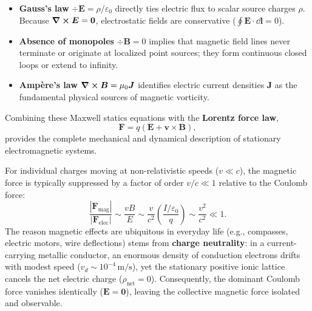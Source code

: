 \begin{remark}
    \begin{itemize}
        \item \textbf{Gauss's law} $\div \bm{E} = \rho / \varepsilon_0$ directly ties electric flux to scalar source charges $\rho$. Because $\curl \bm{E} = \bm{0}$, electrostatic fields are conservative ($\oint \bm{E}\cdot \dd{\bm{l}} = 0$).
        \item \textbf{Absence of monopoles} $\div \bm{B} = 0$ implies that magnetic field lines never terminate or originate at localized point sources; they form continuous closed loops or extend to infinity.
        \item \textbf{Ampère's law} $\curl \bm{B} = \mu_0 \bm{J}$ identifies electric current densities $\bm{J}$ as the fundamental physical sources of magnetic vorticity.
    \end{itemize}
\end{remark}

Combining these Maxwell statics equations with the \textbf{Lorentz force law},
\begin{equation}
    \bm{F} = q(\bm{E} + \bm{v}\times \bm{B}),
\end{equation}
provides the complete mechanical and dynamical description of stationary electromagnetic systems.

\begin{remark}
    For individual charges moving at non-relativistic speeds ($v \ll c$), the magnetic force is typically suppressed by a factor of order $v/c \ll 1$ relative to the Coulomb force:
    \begin{equation}
        \frac{|\bm{F}_{\text{mag}}|}{|\bm{F}_{\text{elec}}|} \sim \frac{v B}{E} \sim \frac{v}{c^2} \left(\frac{I/\varepsilon_0}{q}\right) \sim \frac{v^2}{c^2} \ll 1.
    \end{equation}
    The reason magnetic effects are ubiquitous in everyday life (e.g., compasses, electric motors, wire deflections) stems from \textbf{charge neutrality}: in a current-carrying metallic conductor, an enormous density of conduction electrons drifts with modest speed ($v_d \sim 10^{-4}\,\text{m/s}$), yet the stationary positive ionic lattice cancels the net electric charge ($\rho_{\text{net}} = 0$). Consequently, the dominant Coulomb force vanishes identically ($\bm{E} = \bm{0}$), leaving the collective magnetic force isolated and observable.
\end{remark}

